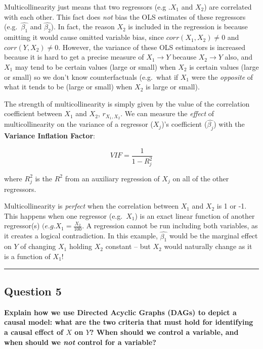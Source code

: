 \documentclass[
]{article}
\begin{document}
Multicollinearity just means that two regressors (e.g .\(X_1\) and
\(X_2\)) are correlated with each other. This fact does \emph{not} bias
the OLS estimates of these regressors (e.g.~\(\hat{\beta_1}\) and
\(\hat{\beta_2}\)). In fact, the reason \(X_2\) is included in the
regression is because omitting it would cause omitted variable bias,
since \(corr(X_1,X_2)\neq 0\) and \(corr(Y, X_2)\neq 0\). However, the
variance of these OLS estimators is increased because it is hard to get
a precise measure of \(X_1\rightarrow Y\) because \(X_2\rightarrow Y\)
also, and \(X_1\) may tend to be certain values (large or small) when
\(X_2\) is certain values (large or small) so we don't know
counterfactuals (e.g.~what if \(X_1\) were the \emph{opposite} of what
it tends to be (large or small) when \(X_2\) is large or small).

The strength of multicollinearity is simply given by the value of the
correlation coefficient between \(X_1\) and \(X_2\), \(r_{X_1,X_2}\). We
can measure the \emph{effect} of multicollinearity on the variance of a
regressor (\(X_j\))'s coefficient (\(\hat{\beta_j}\)) with the
\textbf{Variance Inflation Factor}:

\[VIF=\frac{1}{1-R^2_j}\]

where \(R^2_j\) is the \(R^2\) from an auxiliary regression of \(X_j\)
on all of the other regressors.

Multicollinearity is \emph{perfect} when the correlation between \(X_1\)
and \(X_2\) is 1 or -1. This happens when one regressor (e.g.~\(X_1\))
is an exact linear function of another regressor(s)
\((e.g. X_1=\frac{X_2}{100}\). A regression cannot be run including both
variables, as it creates a logical contradiction. In this example,
\(\hat{\beta_1}\) would be the marginal effect on \(Y\) of changing
\(X_1\) holding \(X_2\) constant -- but \(X_2\) would naturally change
as it is a function of \(X_1\)!

\begin{center}\rule{0.5\linewidth}{0.5pt}\end{center}

\hypertarget{question-5}{%
\subsection{Question 5}\label{question-5}}

\textbf{Explain how we use Directed Acyclic Graphs (DAGs) to depict a
causal model: what are the two criteria that must hold for identifying a
causal effect of \(X\) on \(Y\)? When should we control a variable, and
when should we \emph{not} control for a variable?}
\end{document}
